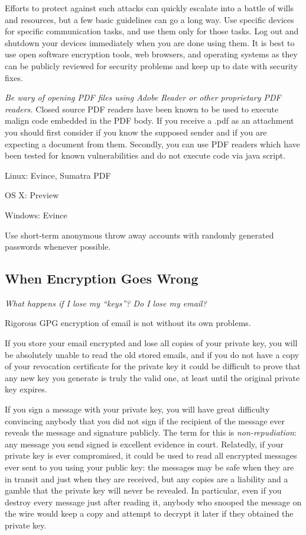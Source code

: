Efforts to protect against such attacks can quickly escalate into a
battle of wills and resources, but a few basic guidelines can go a long
way. Use specific devices for specific communication tasks, and use them
only for those tasks. Log out and shutdown your devices immediately when
you are done using them. It is best to use open software encryption
tools, web browsers, and operating systems as they can be publicly
reviewed for security problems and keep up to date with security fixes.

\emph{Be wary of opening PDF files using Adobe Reader or other
proprietary PDF readers.} Closed source PDF readers have been known to
be used to execute malign code embedded in the PDF body. If you receive
a .pdf as an attachment you should first consider if you know the
supposed sender and if you are expecting a document from them. Secondly,
you can use PDF readers which have been tested for known vulnerabilities
and do not execute code via java script.

Linux: Evince, Sumatra PDF

OS X: Preview

Windows: Evince

Use short-term anonymous throw away accounts with randomly generated
passwords whenever possible.

\subsection{When Encryption Goes Wrong}

\emph{What happens if I lose my ``keys''? Do I lose my email?}

Rigorous GPG encryption of email is not without its own problems.

If you store your email encrypted and lose all copies of your private
key, you will be absolutely unable to read the old stored emails, and if
you do not have a copy of your revocation certificate for the private
key it could be difficult to prove that any new key you generate is
truly the valid one, at least until the original private key expires.

If you sign a message with your private key, you will have great
difficulty convincing anybody that you did not sign if the recipient of
the message ever reveals the message and signature publicly. The term
for this is \emph{non-repudiation}: any message you send signed is
excellent evidence in court. Relatedly, if your private key is ever
compromised, it could be used to read all encrypted messages ever sent
to you using your public key: the messages may be safe when they are in
transit and just when they are received, but any copies are a liability
and a gamble that the private key will never be revealed. In particular,
even if you destroy every message just after reading it, anybody who
snooped the message on the wire would keep a copy and attempt to decrypt
it later if they obtained the private key.

